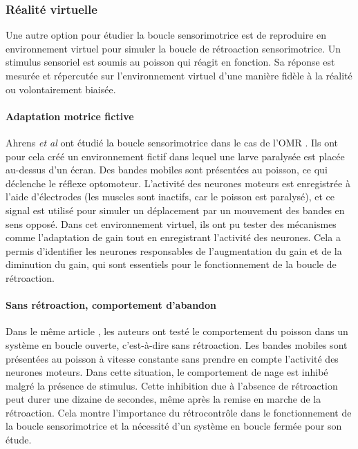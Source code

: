 \subsubsection{Réalité virtuelle}

Une autre option pour étudier la boucle sensorimotrice est de reproduire en environnement virtuel pour simuler la boucle de rétroaction sensorimotrice. Un stimulus sensoriel est soumis au poisson qui réagit en fonction. Sa réponse est mesurée et répercutée sur l'environnement virtuel d'une manière fidèle à la réalité ou volontairement biaisée.

\paragraph{Adaptation motrice fictive}
Ahrens \emph{et al} ont étudié la boucle sensorimotrice dans le cas de l'OMR \cite{ahrens_brain-wide_2012}. Ils ont pour cela créé un environnement fictif dans lequel une larve paralysée est placée au-dessus d'un écran. Des bandes mobiles sont présentées au poisson, ce qui déclenche le réflexe optomoteur. L'activité des neurones moteurs est enregistrée à l'aide d'électrodes (les muscles sont inactifs, car le poisson est paralysé), et ce signal est utilisé pour simuler un déplacement par un mouvement des bandes en sens opposé. Dans cet environnement virtuel, ils ont pu tester des mécanismes comme l'adaptation de gain tout en enregistrant l'activité des neurones. Cela a permis d'identifier les neurones responsables de l'augmentation du gain et de la diminution du gain, qui sont essentiels pour le fonctionnement de la boucle de rétroaction.

\paragraph{Sans rétroaction, comportement d'abandon} %
Dans le même article \cite{ahrens_brain-wide_2012}, les auteurs ont testé le comportement du poisson dans un système en boucle ouverte, c'est-à-dire sans rétroaction. Les bandes mobiles sont présentées au poisson à vitesse constante sans prendre en compte l'activité des neurones moteurs. Dans cette situation, le comportement de nage est inhibé malgré la présence de stimulus. Cette inhibition due à l'absence de rétroaction peut durer une dizaine de secondes, même après la remise en marche de la rétroaction. Cela montre l'importance du rétrocontrôle dans le fonctionnement de la boucle sensorimotrice et la nécessité d'un système en boucle fermée pour son étude. 

